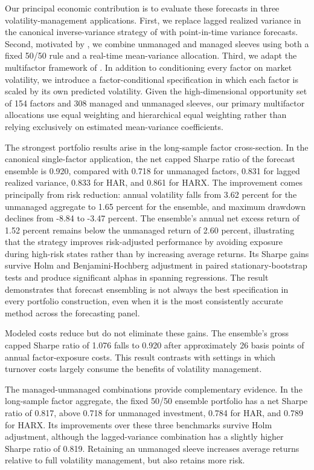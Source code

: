 \documentclass[preprint,12pt,authoryear]{elsarticle}
\begin{document}
Our principal economic contribution is to evaluate these forecasts in three volatility-management applications. First, we replace lagged realized variance in the canonical inverse-variance strategy of \citet{moreiramuir2017} with point-in-time variance forecasts. Second, motivated by \citet{cederburg2020}, we combine unmanaged and managed sleeves using both a fixed 50/50 rule and a real-time mean-variance allocation. Third, we adapt the multifactor framework of \citet{demiguelmartinutrerauppal2024}. In addition to conditioning every factor on market volatility, we introduce a factor-conditional specification in which each factor is scaled by its own predicted volatility. Given the high-dimensional opportunity set of 154 factors and 308 managed and unmanaged sleeves, our primary multifactor allocations use equal weighting and hierarchical equal weighting rather than relying exclusively on estimated mean-variance coefficients.

The strongest portfolio results arise in the long-sample factor cross-section. In the canonical single-factor application, the net capped Sharpe ratio of the forecast ensemble is 0.920, compared with 0.718 for unmanaged factors, 0.831 for lagged realized variance, 0.833 for HAR, and 0.861 for HARX. The improvement comes principally from risk reduction: annual volatility falls from 3.62 percent for the unmanaged aggregate to 1.65 percent for the ensemble, and maximum drawdown declines from -8.84 to -3.47 percent. The ensemble's annual net excess return of 1.52 percent remains below the unmanaged return of 2.60 percent, illustrating that the strategy improves risk-adjusted performance by avoiding exposure during high-risk states rather than by increasing average returns. Its Sharpe gains survive Holm and Benjamini-Hochberg adjustment in paired stationary-bootstrap tests and produce significant alphas in spanning regressions. The result demonstrates that forecast ensembling is not always the best specification in every portfolio construction, even when it is the most consistently accurate method across the forecasting panel.

Modeled costs reduce but do not eliminate these gains. The ensemble's gross capped Sharpe ratio of 1.076 falls to 0.920 after approximately 26 basis points of annual factor-exposure costs. This result contrasts with settings in which turnover costs largely consume the benefits of volatility management. 

The managed-unmanaged combinations provide complementary evidence. In the long-sample factor aggregate, the fixed 50/50 ensemble portfolio has a net Sharpe ratio of 0.817, above 0.718 for unmanaged investment, 0.784 for HAR, and 0.789 for HARX. Its improvements over these three benchmarks survive Holm adjustment, although the lagged-variance combination has a slightly higher Sharpe ratio of 0.819. Retaining an unmanaged sleeve increases average returns relative to full volatility management, but also retains more risk. 
\end{document}

